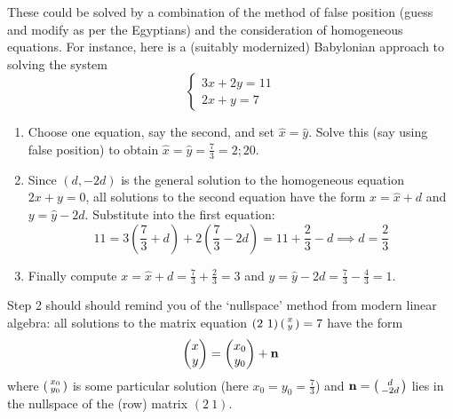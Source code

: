 \goodbreak



These could be solved by a combination of the method of false position (guess and modify as per the Egyptians) and the consideration of homogeneous equations. For instance, here is a (suitably modernized) Babylonian approach to solving the system
\[
	\begin{cases}
		3x+2y=11\\
		2x+y=7
	\end{cases}
\]
\begin{enumerate}
  \item Choose one equation, say the second, and set $\hat x=\hat y$. Solve this (say using false position) to obtain $\hat x=\hat y=\frac 73=2;20$.
  \item Since $(d,-2d)$ is the general solution to the homogeneous equation $2x+y=0$, all solutions to the second equation have the form $x=\hat x+d$ and $y=\hat y-2d$. Substitute into the first equation:
  \[
  	11=3\left(\frac 73+d\right)+2\left(\frac 73-2d\right)=11+\frac 23-d\implies d=\frac 23
  \]
  \item Finally compute $x=\hat x+d=\frac 73+\frac 23=3$ and $y=\hat y-2d=\frac 73-\frac 43=1$.
\end{enumerate}
Step 2 should should remind you of the `nullspace' method from modern linear algebra: all solutions to the matrix equation $(2\ 1)\left(\begin{smallmatrix}x\\y\end{smallmatrix}\right)=7$ have the form
\[
	\begin{pmatrix}x\\y\end{pmatrix}=\begin{pmatrix}x_0\\y_0\end{pmatrix}+{\mathbf{n}}
\]
where $\left(\begin{smallmatrix}x_0\\y_0\end{smallmatrix}\right)$ is some particular solution (here $x_0=y_0=\frac 73$) and ${\mathbf{n}}=\left(\begin{smallmatrix}d\\-2d\end{smallmatrix}\right)$ lies in the nullspace of the (row) matrix $(2\ 1)$.


\label{ybc7289}

